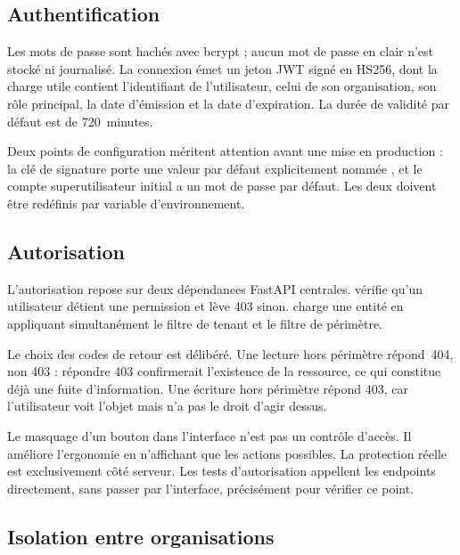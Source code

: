 \subsection{Authentification}

Les mots de passe sont hachés avec bcrypt ; aucun mot de passe en clair n'est stocké ni
journalisé. La connexion émet un jeton JWT signé en HS256, dont la charge utile contient
l'identifiant de l'utilisateur, celui de son organisation, son rôle principal, la date
d'émission et la date d'expiration. La durée de validité par défaut est de 720~minutes.

Deux points de configuration méritent attention avant une mise en production : la clé de
signature porte une valeur par défaut explicitement nommée
, et le compte superutilisateur initial a un mot de passe
par défaut. Les deux doivent être redéfinis par variable d'environnement.

\subsection{Autorisation}

L'autorisation repose sur deux dépendances FastAPI centrales.
 vérifie qu'un utilisateur détient une permission et lève 403
sinon.  charge une entité en appliquant simultanément le
filtre de tenant et le filtre de périmètre.

Le choix des codes de retour est délibéré. Une lecture hors périmètre répond~404, non
403 : répondre 403 confirmerait l'existence de la ressource, ce qui constitue déjà une
fuite d'information. Une écriture hors périmètre répond 403, car l'utilisateur voit
l'objet mais n'a pas le droit d'agir dessus.

\begin{remarque}
Le masquage d'un bouton dans l'interface n'est pas un contrôle d'accès. Il améliore
l'ergonomie en n'affichant que les actions possibles. La protection réelle est
exclusivement côté serveur. Les tests d'autorisation appellent les endpoints
directement, sans passer par l'interface, précisément pour vérifier ce point.
\end{remarque}

\subsection{Isolation entre organisations}

